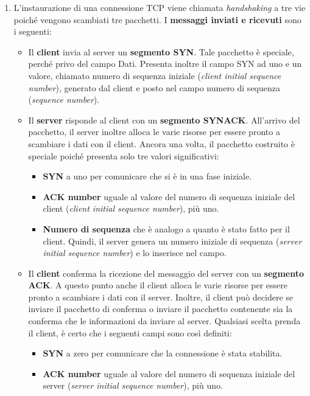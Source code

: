 \documentclass[a4paper]{article}
\begin{document}
\begin{enumerate}
		\item L'instaurazione di una connessione TCP viene chiamata \emph{handshaking} a tre vie poiché vengono scambiati tre pacchetti. I \textbf{messaggi inviati e ricevuti} sono i seguenti:
		\begin{itemize}
			\item Il \textbf{client} invia al server un \textbf{segmento SYN}. Tale pacchetto è speciale, perché privo del campo Dati. Presenta inoltre il campo SYN ad uno e un valore, chiamato numero di sequenza iniziale (\emph{client initial sequence number}), generato dal client e posto nel campo numero di sequenza (\emph{sequence number}).
			
			\item Il \textbf{server} risponde al client con un \textbf{segmento SYNACK}. All'arrivo del pacchetto, il server inoltre alloca le varie risorse per essere pronto a scambiare i dati con il client.\newline
			Ancora una volta, il pacchetto costruito è speciale poiché presenta solo tre valori significativi:
			\begin{itemize}
				\item \textbf{SYN} a uno per comunicare che si è in una fase iniziale.
				
				\item \textbf{ACK number} uguale al valore del numero di sequenza iniziale del client (\emph{client initial sequence number}), più uno.
				
				\item \textbf{Numero di sequenza} che è analogo a quanto è stato fatto per il client. Quindi, il server genera un numero iniziale di sequenza (\emph{server initial sequence number}) e lo inserisce nel campo.
			\end{itemize}
			
			\item Il \textbf{client} conferma la ricezione del messaggio del server con un \textbf{segmento ACK}. A questo punto anche il client alloca le varie risorse per essere pronto a scambiare i dati con il server.\newline
			Inoltre, il client può decidere se inviare il pacchetto di conferma o inviare il pacchetto contenente sia la conferma che le informazioni da inviare al server. Qualsiasi scelta prenda il client, è certo che i seguenti campi sono così definiti:
			\begin{itemize}
				\item \textbf{SYN} a zero per comunicare che la connessione è stata stabilita.
				
				\item \textbf{ACK number} uguale al valore del numero di sequenza iniziale del server (\emph{server initial sequence number}), più uno.
			\end{itemize}
		\end{itemize}\label{TCP instaurazione connessione}
	\end{enumerate}
	
\end{document}
